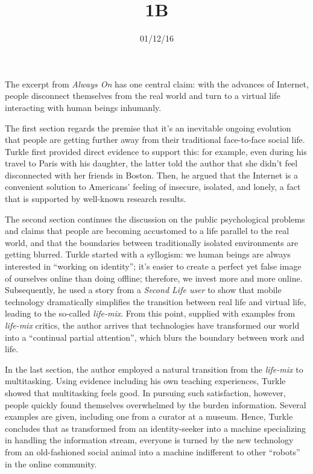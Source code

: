 \documentclass{writing}
\title{1B}
\date{01/12/16}
\begin{document}
\maketitle

The excerpt from \emph{Always On} has one central claim: with the
advances of Internet, people disconnect themselves from the real world
and turn to a virtual life interacting with human beings inhumanly.

The first section regards the premise that it's an
inevitable ongoing evolution that people are getting further away from
their traditional face-to-face social life. Turkle first provided direct
evidence to support this: for example, even during his travel to Paris
with his daughter, the latter told the author that she didn't feel
disconnected with her friends in Boston. Then, he argued that the
Internet is a convenient solution to Americans' feeling of insecure,
isolated, and lonely, a fact that is supported by well-known research
results.

The second section continues the discussion on the public psychological
problems and claims that people are becoming accustomed to a life
parallel to the real world, and that the boundaries between
traditionally isolated environments are getting blurred. Turkle started
with a syllogism: we human beings are always interested in ``working on
identity''; it's easier to create a perfect yet false image of ourselves
online than doing offline; therefore, we invest more and more online.
Subsequently, he used a story from a \emph{Second Life user} to show
that mobile technology dramatically simplifies the transition between
real life and virtual life, leading to the so-called \emph{life-mix}.
From this point, supplied with examples from \emph{life-mix} critics,
the author arrives that technologies have transformed our world into a
``continual partial attention'', which blurs the boundary between work
and life.

In the last section, the author employed a natural transition from the
\emph{life-mix} to multitasking. Using evidence including his own
teaching experiences, Turkle showed that multitasking feels good. In
pursuing such satisfaction, however, people quickly found themselves
overwhelmed by the burden information. Several examples are given,
including one from a curator at a museum. Hence, Turkle concludes that
as transformed from an identity-seeker into a machine specializing in
handling the information stream, everyone is turned by the new
technology from an old-fashioned social animal into a machine
indifferent to other ``robots'' in the online community.
\end{document}
